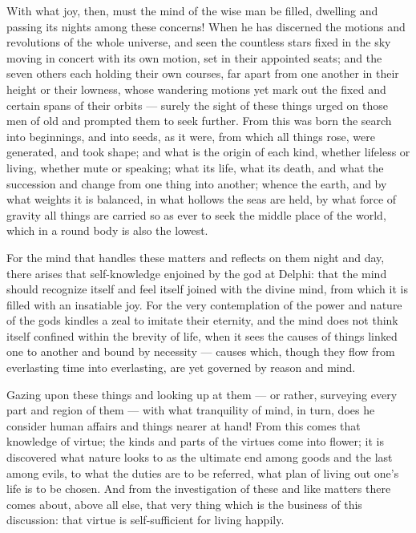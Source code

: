  With what joy, then, must the mind of the wise man be filled, dwelling and passing its nights among these concerns! When he has discerned the motions and revolutions of the whole universe, and seen the countless stars fixed in the sky moving in concert with its own motion, set in their appointed seats; and the seven others each holding their own courses, far apart from one another in their height or their lowness, whose wandering motions yet mark out the fixed and certain spans of their orbits — surely the sight of these things urged on those men of old and prompted them to seek further. From this was born the search into beginnings, and into seeds, as it were, from which all things rose, were generated, and took shape; and what is the origin of each kind, whether lifeless or living, whether mute or speaking; what its life, what its death, and what the succession and change from one thing into another; whence the earth, and by what weights it is balanced, in what hollows the seas are held, by what force of gravity all things are carried so as ever to seek the middle place of the world, which in a round body is also the lowest.

 For the mind that handles these matters and reflects on them night and day, there arises that self-knowledge enjoined by the god at Delphi: that the mind should recognize itself and feel itself joined with the divine mind, from which it is filled with an insatiable joy. For the very contemplation of the power and nature of the gods kindles a zeal to imitate their eternity, and the mind does not think itself confined within the brevity of life, when it sees the causes of things linked one to another and bound by necessity — causes which, though they flow from everlasting time into everlasting, are yet governed by reason and mind.

 Gazing upon these things and looking up at them — or rather, surveying every part and region of them — with what tranquility of mind, in turn, does he consider human affairs and things nearer at hand! From this comes that knowledge of virtue; the kinds and parts of the virtues come into flower; it is discovered what nature looks to as the ultimate end among goods and the last among evils, to what the duties are to be referred, what plan of living out one's life is to be chosen. And from the investigation of these and like matters there comes about, above all else, that very thing which is the business of this discussion: that virtue is self-sufficient for living happily.


